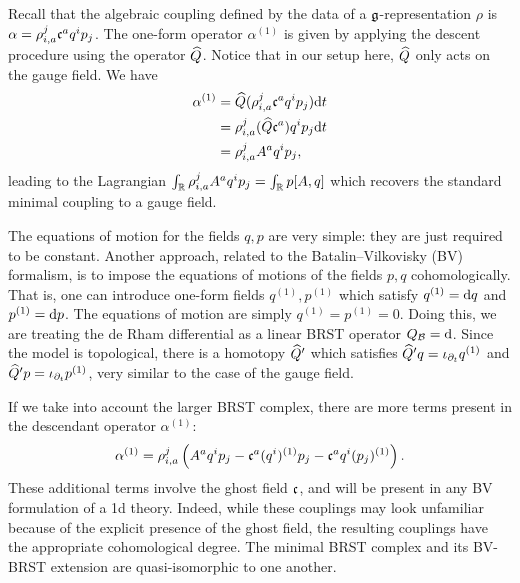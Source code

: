 \documentclass[11pt]{amsart}
\def\brian#1{{\textcolor{blue!65!red}{BRW: {#1}}}}
\begin{document}
Recall that the algebraic coupling defined by the data of a $\fg$-representation $\rho$ is $\alpha = \rho_{i,a}^j \fc^a q^i p_j$.
The one-form operator $\alpha^{(1)}$ is given by applying the descent procedure using the operator $\Hat{Q}$. 
Notice that in our setup here, $\Hat{Q}$ only acts on the gauge field.
We have
\begin{align*}
\alpha^{(1)} & = \Hat{Q} (\rho_{i,a}^j \fc^a q^i p_j) \d t  \\
& = \rho_{i,a}^j (\Hat{Q} \fc^a) q^i p_j \d t \\
& = \rho_{i,a}^j A^a q^i p_j ,
\end{align*}
leading to the Lagrangian $\int_{\RR} \rho_{i,a}^j A^a q^i p_j = \int_\RR p [A,q]$ which recovers the standard minimal coupling to a gauge field. 

The equations of motion for the fields $q,p$ are very simple: they are just required to be constant. 
Another approach, related to the Batalin--Vilkovisky (BV) formalism, is to impose the equations of motions of the fields $p,q$ cohomologically. 
That is, one can introduce one-form fields $q^{(1)}, p^{(1)}$ which satisfy $q^{(1)} = \d q$ and $p^{(1)} = \d p$. 
The equations of motion are simply $q^{(1)} = p^{(1)} = 0$. 
Doing this, we are treating the de Rham differential as a linear BRST operator $Q_{\cB} = \d$. 
Since the model is topological, there is a homotopy $\Hat{Q}'$ which satisfies $\Hat{Q}' q = \iota_{\partial_t} q^{(1)}$ and $\Hat{Q}' p = \iota_{\partial_t} p^{(1)}$, very similar to the case of the gauge field.

If we take into account the larger BRST complex, there are more terms present in the descendant operator $\alpha^{(1)}$:
\[
\alpha^{(1)} = \rho_{i,a}^j \left(A^a q^i p_j - \fc^a (q^i)^{(1)} p_j - \fc^a q^i (p_j)^{(1)}\right) . 
\] 
These additional terms involve the ghost field $\fc$, and will be present in any BV formulation of a 1d theory.  Indeed, while these couplings may look unfamiliar because of the explicit presence of the ghost field, the resulting couplings have the appropriate cohomological degree. The minimal BRST complex and its BV-BRST extension are quasi-isomorphic to one another. 



\end{document}
